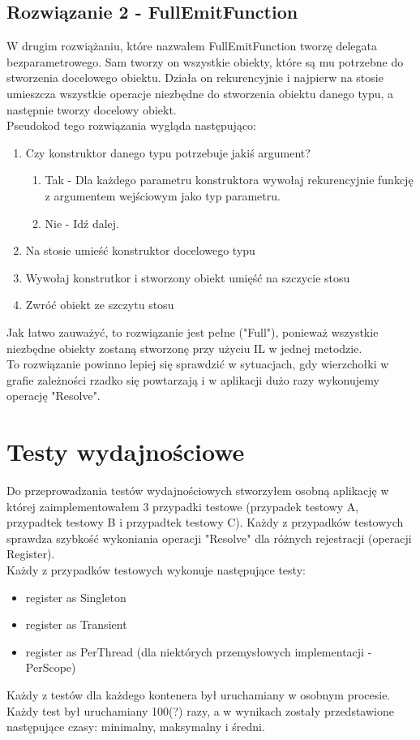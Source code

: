 \documentclass[12pt]{article}
\begin{document}
\subsection{Rozwiązanie 2 - FullEmitFunction}
W drugim rozwiążaniu, które nazwałem FullEmitFunction tworzę delegata bezparametrowego. Sam tworzy on wszystkie obiekty, które są mu potrzebne do stworzenia docelowego obiektu. Działa on rekurencyjnie i najpierw na stosie umieszcza wszystkie operacje niezbędne do stworzenia obiektu danego typu, a następnie tworzy docelowy obiekt.\\
Pseudokod tego rozwiązania wygląda następująco:
\begin{enumerate}
	\item Czy konstruktor danego typu potrzebuje jakiś argument?
	\begin{enumerate}
		\item Tak - Dla każdego parametru konstruktora wywołaj rekurencyjnie funkcję z argumentem wejściowym jako typ parametru.
		\item Nie - Idź dalej.
	\end{enumerate}
	\item Na stosie umieść konstruktor docelowego typu
	\item Wywołaj konstrutkor i stworzony obiekt umięść na szczycie stosu
	\item Zwróć obiekt ze szczytu stosu
\end{enumerate}
Jak łatwo zauważyć, to rozwiązanie jest pełne ("Full"), ponieważ wszystkie niezbędne obiekty zostaną stworzonę przy użyciu IL w jednej metodzie.\\
To rozwiązanie powinno lepiej się sprawdzić w sytuacjach, gdy wierzchołki w grafie zależności rzadko się powtarzają i w aplikacji dużo razy wykonujemy operację "Resolve".



\clearpage

\section{Testy wydajnościowe}
Do przeprowadzania testów wydajnościowych stworzyłem osobną aplikację w której zaimplementowałem 3 przypadki testowe (przypadek testowy A, przypadtek testowy B i przypadtek testowy C). Każdy z przypadków testowych sprawdza szybkość wykoniania operacji "Resolve" dla różnych rejestracji (operacji Register).\\
Każdy z przypadków testowych wykonuje następujące testy:
\begin{itemize}
	\item register as Singleton
	\item register as Transient
	\item register as PerThread (dla niektórych przemysłowych implementacji - PerScope)
\end{itemize}
Każdy z testów dla każdego kontenera był uruchamiany w osobnym procesie. Każdy test był uruchamiany 100(?) razy, a w wynikach zostały przedstawione następujące czasy: minimalny,  maksymalny i średni.
\end{document}
